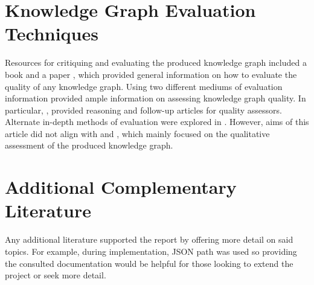 \section{Knowledge Graph Evaluation Techniques}
\hspace{0.5cm} Resources for critiquing and evaluating the produced knowledge graph included a book \cite{knowledgegraphevaulationbook} and a paper \cite{evaluationpaper}, which provided general information on how to evaluate the quality of any knowledge graph. Using two different mediums of evaluation information provided ample information on assessing knowledge graph quality. In particular, \cite{evaluationpaper}, provided reasoning and follow-up articles for quality assessors. Alternate in-depth methods of evaluation were explored in \cite{gao2019efficient}. However, aims of this article did not align with \cite{knowledgegraphevaulationbook} and \cite{evaluationpaper}, which mainly focused on the qualitative assessment of the produced knowledge graph. 

\section{Additional Complementary Literature}
\hspace{0.5cm} Any additional literature supported the report by offering more detail on said topics. For example, during implementation, JSON path was used so providing the consulted documentation \cite{jsonpath} would be helpful for those looking to extend the project or seek more detail. 
